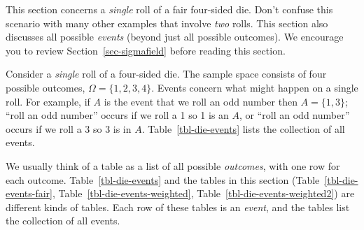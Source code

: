 \documentclass[
  letterpaper,
  DIV=11,
  numbers=noendperiod]{scrreprt}
\theoremstyle{plain}
\theoremstyle{definition}
\theoremstyle{definition}
\theoremstyle{definition}
\theoremstyle{remark}
\begin{document}
\begin{tcolorbox}[enhanced jigsaw, opacityback=0, rightrule=.15mm, coltitle=black, colframe=quarto-callout-caution-color-frame, toprule=.15mm, colbacktitle=quarto-callout-caution-color!10!white, opacitybacktitle=0.6, left=2mm, toptitle=1mm, breakable, title={Caution}, bottomtitle=1mm, colback=white, leftrule=.75mm, titlerule=0mm, arc=.35mm, bottomrule=.15mm]

This section concerns a \emph{single} roll of a fair four-sided die.
Don't confuse this scenario with many other examples that involve
\emph{two} rolls. This section also discusses all possible \emph{events}
(beyond just all possible outcomes). We encourage you to review
Section~\ref{sec-sigmafield} before reading this section.

\end{tcolorbox}

Consider a \emph{single} roll of a four-sided die. The sample space
consists of four possible outcomes, \(\Omega = \{1, 2, 3, 4\}\). Events
concern what might happen on a single roll. For example, if \(A\) is the
event that we roll an odd number then \(A = \{1, 3\}\); ``roll an odd
number'' occurs if we roll a 1 so 1 is an \(A\), or ``roll an odd
number'' occurs if we roll a 3 so 3 is in \(A\).
Table~\ref{tbl-die-events} lists the collection of all events.

\begin{tcolorbox}[enhanced jigsaw, opacityback=0, rightrule=.15mm, coltitle=black, colframe=quarto-callout-caution-color-frame, toprule=.15mm, colbacktitle=quarto-callout-caution-color!10!white, opacitybacktitle=0.6, left=2mm, toptitle=1mm, breakable, title={Caution}, bottomtitle=1mm, colback=white, leftrule=.75mm, titlerule=0mm, arc=.35mm, bottomrule=.15mm]

We usually think of a table as a list of all possible \emph{outcomes},
with one row for each outcome. Table~\ref{tbl-die-events} and the tables
in this section (Table~\ref{tbl-die-events-fair},
Table~\ref{tbl-die-events-weighted},
Table~\ref{tbl-die-events-weighted2}) are different kinds of tables.
Each row of these tables is an \emph{event}, and the tables list the
collection of all events.

\end{tcolorbox}
\end{document}
